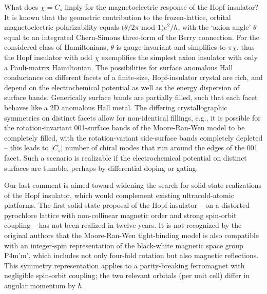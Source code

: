 \documentclass[aps,prl,showpacs,twocolumn,superscriptaddress]{revtex4-1}
\begin{document}


What does $\chi{=}C_s$ imply for the magnetoelectric response of the Hopf insulator? It is known that the geometric contribution to the  frozen-lattice, orbital magnetoelectric polarizability equals $(\theta/2\pi$ mod $1)e^2/h$, with the `axion angle'\cite{Wilczek_axion} $\theta$  equal to an integrated Chern-Simons three-form of the Berry connection.\cite{qi_topologicalfieldtheory,essin_magnetoelectric} For the considered class of Hamiltonians, $\theta$ is gauge-invariant and simplifies to $\pi\chi$, thus the Hopf insulator with odd $\chi$ exemplifies the simplest axion insulator\cite{qi_topologicalfieldtheory,essin_magnetoelectric,turner_inversionsymmetricTI,hughes_inversionsymmetricTI,vanderbilt_book_berryelectronicstructure,Schindler_higherorderTI}  with only a Pauli-matrix Hamiltonian. The possibilities for surface anomalous Hall conductance  on different facets of a finite-size, Hopf-insulator crystal are rich, and depend on the electrochemical potential as well as the energy dispersion of surface bands. 
Generically surface bands are partially filled, such that each facet behaves like a 2D anomalous Hall metal.\cite{haldane_berryonfermi} The differing crystallographic symmetries on distinct facets allow for non-identical fillings, e.g., it is possible for the rotation-invariant 001-surface bands of the Moore-Ran-Wen model to be completely filled, with the rotation-variant side-surface bands completely depleted -- this leads to $|C_s|$ number of chiral modes\cite{jackiwrebbi_solitons,goldstonewilczek_solitons,fanzhang_surfacestatemagnetization,sitte_TIinBfields} that run around the edges of the 001 facet. Such a scenario is realizable if the electrochemical potential on distinct surfaces are tunable, perhaps by differential doping or gating. 

Our last comment is aimed toward widening the search for solid-state realizations of the Hopf insulator, which would complement existing ultracold-atomic platforms.\cite{schuster_hopfdipolarspin,Deng_probeknotshopfins}  The first solid-state proposal of the Hopf insulator  -- on a distorted pyrochlore lattice with non-collinear magnetic order and strong spin-orbit coupling -- has not been realized in twelve years.\cite{Hopfinsulator_Moore} It is not recognized by the original authors that the Moore-Ran-Wen tight-binding model is also compatible with an integer-spin representation of the black-white magnetic space group P4m'm', which includes not only four-fold rotation but also magnetic reflections. This symmetry representation applies to a parity-breaking ferromagnet with {negligible} spin-orbit coupling; the two relevant orbitals (per unit cell) differ in angular momentum by $\hbar$.\\
\end{document}
